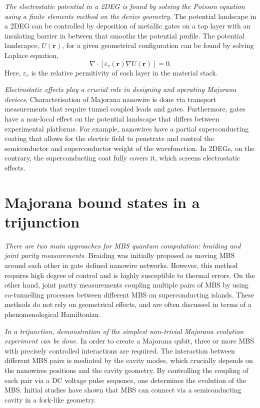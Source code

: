 \textit{The electrostatic potential in a 2DEG is found by solving the Poisson equation using a finite elements method on the device geometry.}
The potential landscape in a 2DEG can be controlled by deposition of metallic gates on a top layer with an insulating barrier in between that smooths the potential profile.
The potential landscapce, $U(\mathbf{r})$, for a given geometrical configuration can be found by solving Laplace equation, 
\begin{equation}
\nabla \cdot \left[ \varepsilon_r(\mathbf{r}) \nabla U(\mathbf{r}) \right] = 0.
\end{equation}
Here, $\varepsilon_r$ is the relative permitivity of each layer in the material stack.

\textit{Electrostatic effects play a crucial role in designing and operating Majorana devices}.
Characterisation of Majorana nanowire is done via transport measurements that require tunnel coupled leads and gates.
Furthermore, gates have a non-local effect on the potential landscape that differs between experimental platforms.
For example, nanowires have a partial superconducting coating that allows for the electric field to penetrate and control the semiconductor and superconductor weight of the wavefunction.
In 2DEGs, on the contrary, the superconducting coat fully covers it, which screens electrostatic effects.

\section{Majorana bound states in a trijunction}

\textit{There are two main approaches for MBS quantum computation: braiding and joint parity measurements.}
Braiding was initially proposed as moving MBS around each other in gate defined nanowire networks\cite{Alicea2011}. 
However, this method requires high degree of control and is highly susceptible to thermal errors\cite{Pedrocchi2015}.
On the other hand, joint parity measurements coupling multiple pairs of MBS\cite{Plugge2017} by using co-tunnelling processes between different MBS on superconducting islands.
These methods do not rely on geometrical effects, and are often discussed in terms of a phenomenological Hamiltonian.

\textit{In a trijunction, demonstration of the simplest non-trivial Majorana evolution experiment can be done.}
In order to create a Majorana qubit, three or more MBS with precisely controlled interactions are required.
The interaction between different MBS pairs is mediated by the cavity modes, which crucially depends on the nanowires positions and the cavity geometry.
By controlling the coupling of each pair via a DC voltage pulse sequence, one determines the evolution of the MBS.
Initial studies\cite{Hell2016} have shown that MBS can connect via a semiconducting cavity in a fork-like geometry.

